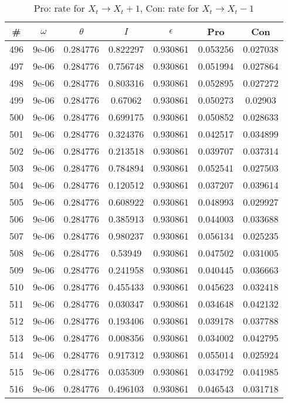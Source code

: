 \newpage
\begin{table}
\caption{Pro: rate for $X_t \rightarrow X_t + 1$, Con: rate for $X_t \rightarrow X_t - 1$}
\begin{tabular*}{\linewidth}{c|c|c|c|c|c|c}
\# & $\omega$ & $\theta$ & $I$ & $\epsilon$ & Pro & Con \\
\hline
496 & 9e-06 & 0.284776 & 0.822297 & 0.930861 & 0.053256 & 0.027038\\
497 & 9e-06 & 0.284776 & 0.756748 & 0.930861 & 0.051994 & 0.027864\\
498 & 9e-06 & 0.284776 & 0.803316 & 0.930861 & 0.052895 & 0.027272\\
499 & 9e-06 & 0.284776 & 0.67062 & 0.930861 & 0.050273 & 0.02903\\
500 & 9e-06 & 0.284776 & 0.699175 & 0.930861 & 0.050852 & 0.028633\\
501 & 9e-06 & 0.284776 & 0.324376 & 0.930861 & 0.042517 & 0.034899\\
502 & 9e-06 & 0.284776 & 0.213518 & 0.930861 & 0.039707 & 0.037314\\
503 & 9e-06 & 0.284776 & 0.784894 & 0.930861 & 0.052541 & 0.027503\\
504 & 9e-06 & 0.284776 & 0.120512 & 0.930861 & 0.037207 & 0.039614\\
505 & 9e-06 & 0.284776 & 0.608922 & 0.930861 & 0.048993 & 0.029927\\
506 & 9e-06 & 0.284776 & 0.385913 & 0.930861 & 0.044003 & 0.033688\\
507 & 9e-06 & 0.284776 & 0.980237 & 0.930861 & 0.056134 & 0.025235\\
508 & 9e-06 & 0.284776 & 0.53949 & 0.930861 & 0.047502 & 0.031005\\
509 & 9e-06 & 0.284776 & 0.241958 & 0.930861 & 0.040445 & 0.036663\\
510 & 9e-06 & 0.284776 & 0.455433 & 0.930861 & 0.045623 & 0.032418\\
511 & 9e-06 & 0.284776 & 0.030347 & 0.930861 & 0.034648 & 0.042132\\
512 & 9e-06 & 0.284776 & 0.193406 & 0.930861 & 0.039178 & 0.037788\\
513 & 9e-06 & 0.284776 & 0.008356 & 0.930861 & 0.034002 & 0.042795\\
514 & 9e-06 & 0.284776 & 0.917312 & 0.930861 & 0.055014 & 0.025924\\
515 & 9e-06 & 0.284776 & 0.035309 & 0.930861 & 0.034792 & 0.041985\\
516 & 9e-06 & 0.284776 & 0.496103 & 0.930861 & 0.046543 & 0.031718\\

\end{tabular*}
\end{table}
